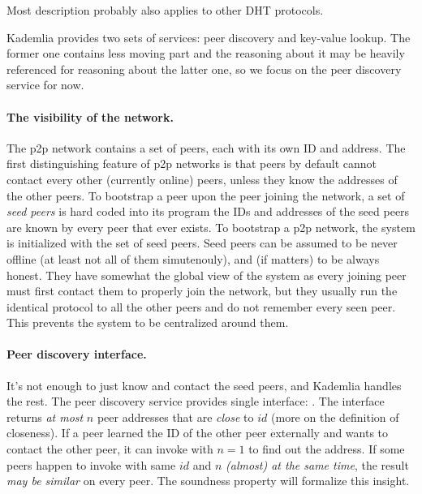 {\tiny Most description probably also applies to other DHT protocols.}

Kademlia provides two sets of services: peer discovery and key-value lookup.
The former one contains less moving part and the reasoning about it may be heavily referenced for reasoning about the latter one, so we focus on the peer discovery service for now.

\paragraph{The visibility of the network.}
The p2p network contains a set of peers, each with its own ID and address.
The first distinguishing feature of p2p networks is that peers by default cannot contact every other (currently online) peers, unless they know the addresses of the other peers.
To bootstrap a peer \ie upon the peer joining the network, a set of \emph{seed peers} is hard coded into its program \ie the IDs and addresses of the seed peers are known by every peer that ever exists.
To bootstrap a p2p network, the system is initialized with the set of seed peers.
Seed peers can be assumed to be never offline (at least not all of them simutenouly), and (if matters) to be always honest.
They have somewhat the global view of the system as every joining peer must first contact them to properly join the network, but they usually run the identical protocol to all the other peers and \eg do not remember every seen peer.
This prevents the system to be centralized around them.

\paragraph{Peer discovery interface.}
It's not enough to just know and contact the seed peers, and Kademlia handles the rest.
The peer discovery service provides single interface: \find[$id$, $n$].
The interface returns \emph{at most} $n$ peer addresses that are \emph{close} to $id$ (more on the definition of closeness).
If a peer learned the ID of the other peer externally and wants to contact the other peer, it can invoke \find with $n = 1$ to find out the address.
If some peers happen to invoke \find with same $id$ and $n$ \emph{(almost) at the same time}, the result \emph{may be similar} on every peer.
The soundness property will formalize this insight.

